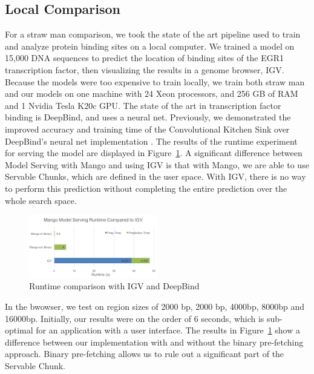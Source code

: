 \documentclass{sig-alternate-05-2015}
\begin{document}
\subsection{Local Comparison}
For a straw man comparison, we took the state of the art pipeline used to train and analyze protein binding sites on a local computer. We trained a model on 15,000 DNA sequences to predict the location of binding sites of the EGR1 transcription factor, then visualizing the results in a genome browser, IGV. Because the models were too expensive to train locally, we train both straw man and our models on one machine with 24 Xeon processors, and 256 GB of RAM and 1 Nvidia Tesla K20c GPU. The state of the art in transcription factor binding is DeepBind, and uses a neural net. Previously, we demonstrated the improved accuracy and training time of the Convolutional Kitchen Sink over DeepBind's neural net implementation \cite{tfbinding}. The results of the runtime experiment for serving the model are displayed in Figure~\ref{fig:igvcomp}. A significant difference between Model Serving with Mango and using IGV is that with Mango, we are able to use Servable Chunks, which are defined in the user space. With IGV, there is no way to perform this prediction without completing the entire prediction over the whole search space.

\begin{figure}
  \label{fig:igvcomp}
  \includegraphics[width=0.5\textwidth]{figures/mangoVsIGV.png}
  \caption{Runtime comparison with IGV and DeepBind}
\end{figure}

In the bwowser, we test on region sizes of 2000 bp, 2000 bp, 4000bp, 8000bp and 16000bp. Initially, our results were on the order of 6 seconds, which is sub-optimal for an application with a user interface. The results in Figure~\ref{fig:igvcomp} show a difference between our implementation with and without the binary pre-fetching approach. Binary pre-fetching allows us to rule out a significant part of the Servable Chunk.
\end{document}
